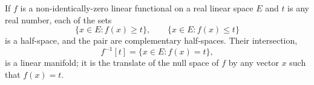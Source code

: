 If $f$ is a non-identically-zero linear functional on a real linear space $E$ and $t$ is any real number, each of the sets
$$
\{x \in E : f(x) \geq t\}, \qquad \{x \in E : f(x) \leq t\}
$$
is a half-space, and the pair are complementary half-spaces. Their intersection,
$$
f^{-1}[t] = \{x \in E : f(x) = t\},
$$
is a linear manifold; it is the translate of the null space of $f$ by any vector $x$ such that $f(x) = t$.
